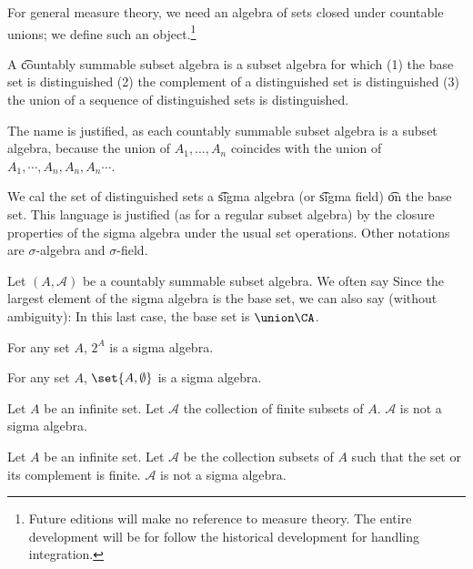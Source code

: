 

For general measure theory,
we need an algebra of sets
closed under countable unions;
we define such an object.\footnote{Future editions will make no reference to measure theory. The entire development will be for follow the historical development for handling integration.}


A \t{countably summable subset algebra}
is a subset algebra for which
(1) the base set is distinguished
(2) the complement of a distinguished
set is distinguished
(3) the union of a sequence of distinguished sets
is distinguished.

The name is justified, as each countably summable subset algebra is a subset algebra, because the union of $A_1, \dots, A_n$ coincides with the union of $A_1, \cdots, A_n, A_n, A_n \cdots$.

We cal the set of distinguished sets a \t{sigma algebra} (or \t{sigma field}) \t{on} the base set.
This language is justified (as for a regular subset algebra) by the closure properties of the sigma algebra under the usual set operations.
Other notations are $\sigma$-algebra and $\sigma$-field.


Let $(A, \mathcal{A})$ be a countably summable subset algebra.
We often say 
Since the largest element of the sigma algebra is the base set, we can also say (without ambiguity): 
In this last case, the base set is $\union \CA$.


\begin{expl}
  For any set $A$, $2^{A}$ is a sigma algebra.
\end{expl}

\begin{expl}
  For any set $A$,
  $\set{A, \emptyset}$ is a sigma algebra.
\end{expl}

\begin{expl}
  Let $A$ be an infinite set.
  Let $\mathcal{A}$ the collection
  of finite subsets of $A$.
  $\mathcal{A}$ is not a sigma algebra.
\end{expl}

\begin{expl}
  Let $A$ be an infinite set.
  Let $\mathcal{A}$ be the collection
  subsets of $A$ such that the set or its
  complement is finite.
  $\mathcal{A}$ is not a sigma algebra.
\end{expl}


